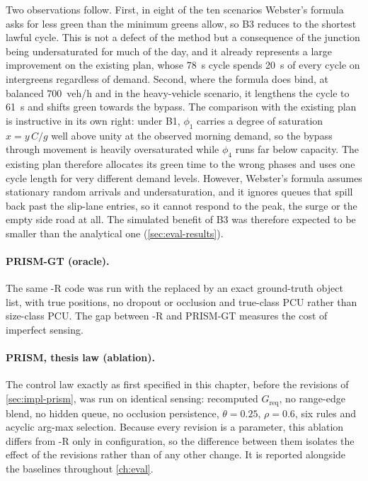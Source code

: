 Two observations follow. First, in eight of the ten scenarios Webster's formula asks for less green than the
minimum greens allow, so B3 reduces to the shortest lawful cycle. This is not a defect of the method but a
consequence of the junction being undersaturated for much of the day, and it already represents a large
improvement on the existing plan, whose 78~s cycle spends 20~s of every cycle on intergreens regardless of
demand. Second, where the formula does bind, at balanced 700~veh/h and in the heavy-vehicle scenario, it
lengthens the cycle to 61~s and shifts green towards the bypass. The comparison with the existing plan is
instructive in its own right: under B1, $\phi_1$ carries a degree of saturation
$x = y\,C/g$ well above unity at the observed morning demand, so the bypass through movement is heavily
oversaturated while $\phi_4$ runs far below capacity. The existing plan therefore allocates its green time
to the wrong phases and uses one cycle length for very different demand levels.
However, Webster's formula assumes stationary random arrivals and undersaturation, and it ignores
queues that spill back past the slip-lane entries, so it cannot respond to the peak, the surge or the empty
side road at all. The simulated benefit of B3 was therefore expected
to be smaller than the analytical one (\cref{sec:eval-results}).

\paragraph{PRISM-GT (oracle).} The same \prism{}-R code was run with the \vls{} replaced by an exact
ground-truth object list, with true positions, no dropout or occlusion and true-class PCU rather than
size-class PCU. The gap between \prism{}-R and PRISM-GT measures the cost of imperfect sensing.

\paragraph{PRISM, thesis law (ablation).} The control law exactly as first specified in this chapter, before
the revisions of \cref{sec:impl-prism}, was run on identical sensing: recomputed $G_{\text{req}}$, no
range-edge blend, no hidden queue, no occlusion persistence, $\theta = 0.25$, $\rho = 0.6$, six rules and
acyclic arg-max selection. Because every revision is a parameter, this ablation differs from \prism{}-R only
in configuration, so the difference between them isolates the effect of the revisions rather than of any
other change. It is reported alongside the baselines throughout \cref{ch:eval}.

